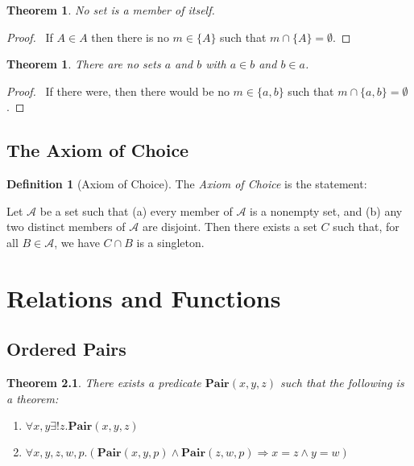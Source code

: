 \documentclass{report}
\let\qed\relax
\newtheorem{theorem}[axiom]{Theorem}
\theoremstyle{definition}
\newtheorem{definition}[axiom]{Definition}
\begin{document}
    \begin{theorem}
        No set is a member of itself.
    \end{theorem}

    \begin{proof}
        \pf\ If $A \in A$ then there is no $m \in \{A\}$ such that $m \cap \{A\} = \emptyset$. \qed
    \end{proof}

    \begin{theorem}
        There are no sets $a$ and $b$ with $a \in b$ and $b \in a$.
    \end{theorem}

    \begin{proof}
        \pf\ If there were, then there would be no $m \in \{ a,b \}$ such that  $m \cap \{ a,b \} = \emptyset$. \qed
    \end{proof}

    \section{The Axiom of Choice}

    \begin{definition}[Axiom of Choice]
        The \emph{Axiom of Choice} is the statement:

        Let $\mathcal{A}$ be a set such that (a) every member of $\mathcal{A}$ is a nonempty set,
        and (b) any two distinct members of $\mathcal{A}$ are disjoint. Then there exists a set $C$
        such that, for all $B \in \mathcal{A}$, we have $C \cap B$ is a singleton.
    \end{definition}

    \chapter{Relations and Functions}

    \section{Ordered Pairs}

    \begin{theorem}
        There exists a predicate $\mathbf{Pair}(x,y,z)$ such that the following is a theorem:
        \begin{enumerate}
            \item $\forall x,y \exists ! z. \mathbf{Pair}(x,y,z)$
            \item $\forall x,y,z,w,p. (\mathbf{Pair}(x,y,p) \wedge \mathbf{Pair}(z,w,p) \Rightarrow x = z \wedge y = w)$
        \end{enumerate}
    \end{theorem}
\end{document}
